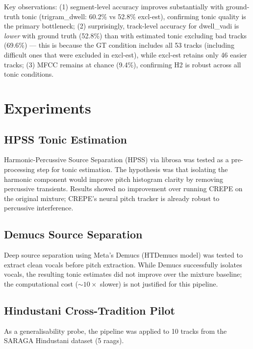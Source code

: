 \documentclass[11pt,a4paper]{article}
\begin{document}
Key observations: (1) segment-level accuracy improves substantially with ground-truth tonic (trigram\_dwell: 60.2\% vs 52.8\% excl-est), confirming tonic quality is the primary bottleneck; (2) surprisingly, track-level accuracy for dwell\_vadi is \textit{lower} with ground truth (52.8\%) than with estimated tonic excluding bad tracks (69.6\%) --- this is because the GT condition includes all 53 tracks (including difficult ones that were excluded in excl-est), while excl-est retains only 46 easier tracks; (3) MFCC remains at chance (9.4\%), confirming H2 is robust across all tonic conditions.

\section{Experiments}

\subsection{HPSS Tonic Estimation}

Harmonic-Percussive Source Separation (HPSS) via librosa was tested as a pre-processing step for tonic estimation. The hypothesis was that isolating the harmonic component would improve pitch histogram clarity by removing percussive transients. Results showed no improvement over running CREPE on the original mixture; CREPE's neural pitch tracker is already robust to percussive interference.

\subsection{Demucs Source Separation}

Deep source separation using Meta's Demucs (HTDemucs model) was tested to extract clean vocals before pitch extraction. While Demucs successfully isolates vocals, the resulting tonic estimates did not improve over the mixture baseline; the computational cost (${\sim}10\times$ slower) is not justified for this pipeline.

\subsection{Hindustani Cross-Tradition Pilot}

As a generalisability probe, the pipeline was applied to 10 tracks from the SARAGA Hindustani dataset (5 raags).
\end{document}
